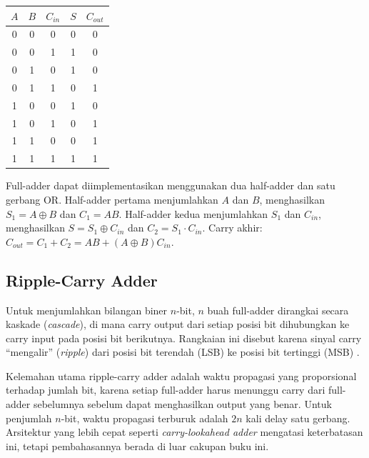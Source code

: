 \begin{center}
\renewcommand{\arraystretch}{1.2}
\begin{tabular}{|c|c|c||c|c|}
\hline
$A$ & $B$ & $C_{in}$ & $S$ & $C_{out}$ \\ \hline
0 & 0 & 0 & 0 & 0 \\ \hline
0 & 0 & 1 & 1 & 0 \\ \hline
0 & 1 & 0 & 1 & 0 \\ \hline
0 & 1 & 1 & 0 & 1 \\ \hline
1 & 0 & 0 & 1 & 0 \\ \hline
1 & 0 & 1 & 0 & 1 \\ \hline
1 & 1 & 0 & 0 & 1 \\ \hline
1 & 1 & 1 & 1 & 1 \\ \hline
\end{tabular}
\end{center}

\begin{konsep}
Full-adder dapat diimplementasikan menggunakan dua half-adder dan satu gerbang OR. Half-adder pertama menjumlahkan $A$ dan $B$, menghasilkan $S_1 = A \oplus B$ dan $C_1 = AB$. Half-adder kedua menjumlahkan $S_1$ dan $C_{in}$, menghasilkan $S = S_1 \oplus C_{in}$ dan $C_2 = S_1 \cdot C_{in}$. Carry akhir: $C_{out} = C_1 + C_2 = AB + (A \oplus B)C_{in}$.
\end{konsep}

\subsection{Ripple-Carry Adder}

Untuk menjumlahkan bilangan biner $n$-bit, $n$ buah full-adder dirangkai secara kaskade (\textit{cascade}), di mana carry output dari setiap posisi bit dihubungkan ke carry input pada posisi bit berikutnya. Rangkaian ini disebut  karena sinyal carry ``mengalir'' (\textit{ripple}) dari posisi bit terendah (LSB) ke posisi bit tertinggi (MSB) \cite{wiki_adder}.

Kelemahan utama ripple-carry adder adalah waktu propagasi yang proporsional terhadap jumlah bit, karena setiap full-adder harus menunggu carry dari full-adder sebelumnya sebelum dapat menghasilkan output yang benar. Untuk penjumlah $n$-bit, waktu propagasi terburuk adalah $2n$ kali delay satu gerbang. Arsitektur yang lebih cepat seperti \textit{carry-lookahead adder} mengatasi keterbatasan ini, tetapi pembahasannya berada di luar cakupan buku ini.
